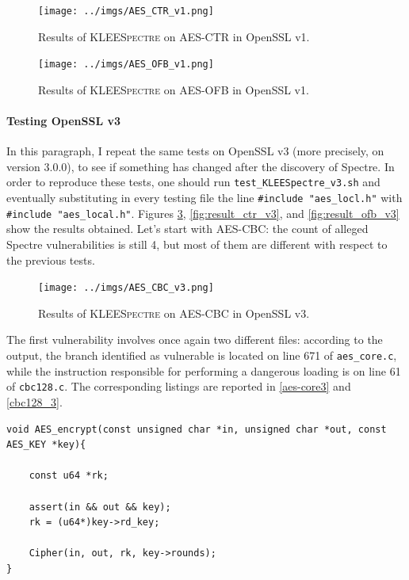 \documentclass[12pt,a4paper]{book}
\theoremstyle{definition}
\begin{document}
	\begin{figure}[!ht]
		\centering
		\texttt{[image: ../imgs/AES\_CTR\_v1.png]}
		\captionsetup{width=.8\linewidth}
		\caption{Results of \textsc{KLEESpectre} on AES-CTR in OpenSSL v1.}
		\label{fig:result_ctr_v1} 
	\end{figure}

	\begin{figure}[!ht]
		\centering
		\texttt{[image: ../imgs/AES\_OFB\_v1.png]}
		\captionsetup{width=.8\linewidth}
		\caption{Results of \textsc{KLEESpectre} on AES-OFB in OpenSSL v1.}
		\label{fig:result_ofb_v1}
	\end{figure}

	\paragraph{Testing OpenSSL v3} In this paragraph, I repeat the same tests on OpenSSL v3 (more precisely, on version 3.0.0), to see if something has changed after the discovery of Spectre. In order to reproduce these tests, one should run \texttt{test\_KLEESpectre\_v3.sh} and eventually substituting in every testing file the line \texttt{\#include "aes\_locl.h"} with \texttt{\#include "aes\_local.h"}. Figures \ref{fig:result_cbc_v3}, \ref{fig:result_ctr_v3}, and \ref{fig:result_ofb_v3} show the results obtained. Let's start with AES-CBC: the count of alleged Spectre vulnerabilities is still 4, but most of them are different with respect to the previous tests.
	
	\begin{figure}[!ht]
		\centering
		\texttt{[image: ../imgs/AES\_CBC\_v3.png]}
		\captionsetup{width=.8\linewidth}
		\caption{Results of \textsc{KLEESpectre} on AES-CBC in OpenSSL v3.}
		\label{fig:result_cbc_v3}
	\end{figure}

	The first vulnerability involves once again two different files: according to the output, the branch identified as vulnerable is located on line 671 of \texttt{aes\_core.c}, while the instruction responsible for performing a dangerous loading is on line 61 of \texttt{cbc128.c}. The corresponding listings are reported in \ref{aes-core3} and \ref{cbc128_3}.
	
	\begin{minipage}{.9\textwidth}
		\begin{lstlisting}[caption={\texttt{aes\_core.c}}, label=aes-core3, firstnumber=667]
void AES_encrypt(const unsigned char *in, unsigned char *out, const AES_KEY *key){
	
	const u64 *rk;
		
	assert(in && out && key);
	rk = (u64*)key->rd_key;
		
	Cipher(in, out, rk, key->rounds);
}
		\end{lstlisting}
	\end{minipage}
	
\end{document}
